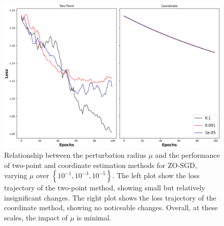 \begin{figure}[H]
    \centering
    \includegraphics[width=\linewidth]{assets/plot_3.png}
    \caption{Relationship between the perturbation radius $\mu$ and the performance of two-point and coordinate estimation methods for ZO-SGD, varying $\mu$ over $\left\{10^{-1}, 10^{-3}, 10^{-5}\right\}$. The left plot show the loss trajectory of the two-point method, showing small but relatively insignificant changes. The right plot shows the loss trajectory of the coordinate method, showing no noticeable changes. Overall, at these scales, the impact of $\mu$ is minimal.}
    \label{fig:plot_3}
\end{figure}